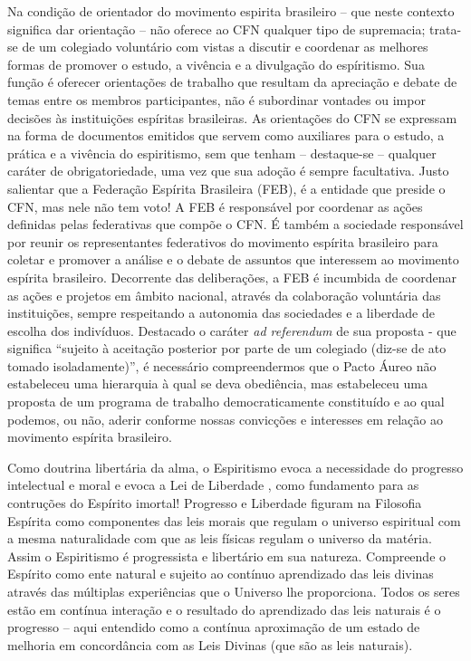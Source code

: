 Na condição de orientador do movimento espirita brasileiro -- que neste contexto significa dar orientação --  não oferece ao CFN qualquer tipo de supremacia; trata-se de um colegiado voluntário com vistas a discutir e coordenar as melhores formas de promover o estudo, a vivência e a divulgação do espíritismo. Sua função é oferecer orientações de trabalho que resultam da apreciação e debate de temas entre os membros participantes, não é subordinar vontades ou impor decisões às instituições espíritas brasileiras. As orientações do CFN se expressam na forma de documentos emitidos que servem como auxiliares para o estudo, a prática e a vivência do espiritismo, sem que tenham -- destaque-se -- qualquer caráter de obrigatoriedade, uma vez que sua adoção é sempre facultativa. Justo salientar que a Federação Espírita Brasileira (FEB), é a entidade que preside o CFN, mas nele não tem voto! A FEB é responsável por coordenar as ações definidas pelas federativas que compõe o CFN. É também a sociedade responsável por reunir os representantes federativos do movimento espírita brasileiro para coletar e promover a análise e o debate de assuntos que interessem ao movimento espírita brasileiro. Decorrente das deliberações, a FEB é incumbida de coordenar as ações e projetos em âmbito nacional, através da colaboração voluntária das instituições, sempre respeitando a autonomia das sociedades e a liberdade de escolha dos indivíduos. Destacado o caráter \emph{ad referendum} de sua proposta - que significa ``sujeito à aceitação posterior por parte de um colegiado (diz-se de ato tomado isoladamente)'', é necessário compreendermos que o Pacto Áureo não estabeleceu uma hierarquia à qual se deva obediência, mas estabeleceu uma proposta de um programa de trabalho democraticamente constituído e ao qual podemos, ou não, aderir conforme nossas convicções e interesses em relação ao movimento espírita brasileiro.   

Como doutrina libertária da alma, o Espiritismo evoca a necessidade do progresso intelectual e moral \cite[Parte III. Cap. VII ]{Kardec1857} e evoca a Lei de Liberdade \cite[Parte III. Cap.X]{Kardec1857}, como fundamento para as contruções do Espírito imortal! Progresso e Liberdade figuram na Filosofia Espírita como componentes das leis morais que regulam o universo espiritual com a mesma naturalidade com que as leis físicas regulam o universo da matéria. Assim o Espiritismo é progressista e libertário em sua natureza. Compreende o Espírito como ente natural e sujeito ao contínuo aprendizado das leis divinas através das múltiplas experiências que o Universo lhe proporciona. Todos os seres estão em contínua interação e o resultado do aprendizado das leis naturais é o progresso -- aqui entendido como a contínua aproximação de um estado de melhoria em concordância com as Leis Divinas (que são as leis naturais). 

